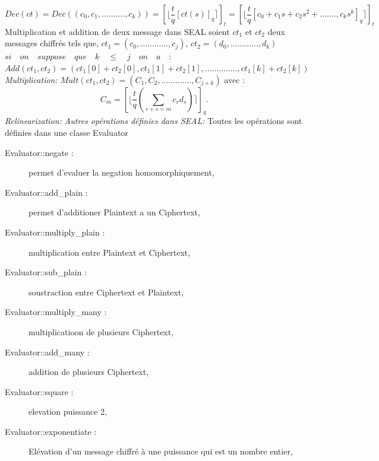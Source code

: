 \documentclass[a4paper,12pt]{article}
\begin{document}
$Dec(ct) = Dec((c_0, c_1, .........., c_k)) = [\lfloor\dfrac{t}{q}[ct(s)]_q\rceil]_t = [\lfloor\dfrac{t}{q}[c_0 + c_1s+c_2s^2+.......,c_ks^k]_q\rceil]_t$\newline
Multiplication et addition de deux message dans SEAL\newline
{}
\hspace{2cm}soient $ct_1$ et $ct_2$ deux messages chiffrés tels que,\newline
\hspace{2cm}$ct_1 = (c_0,............,c_j)$, $ct_2 = (d_0,............,d_k)$
\newline
\newline
\hspace{2cm}$si\quad on\quad suppose\quad que\quad k\quad \leq \quad j\quad on\quad a \quad:$\newline
\newline
\hspace{2cm}$Add(ct_1, ct_2) = (ct_1[0]+ct_2[0],ct_1[1]+ct_2[1],..............,ct_1[k]+ct_2[k])$\newline
\newline
\hspace{2cm}\textit{Multiplication:}\newline
\newline
\hspace{2cm}$Mult(ct_1, ct_2) = (C_1,C_2,............., C_{j+k})$ avec :\newline
\hspace{2cm}$$C_m = [\lfloor\dfrac{t}{q}(\sum_{r+s=m}^{}c_rd_s)\rceil]_q.$$
\hspace{2cm}\textit{Relinearization:}\newline
\newline
\textit{Autres opérations définies dans SEAL:}\newline
Toutes les opérations sont définies dans une classe Evaluator\newline
\begin{description}
 \item[Evaluator::negate :] permet d'evaluer la negation homomorphiquement,
 \item[Evaluator::add\_plain :] permet d'additioner Plaintext a un Ciphertext,
 \item[Evaluator::multiply\_plain :] multiplication entre Plaintext et Ciphertext,
 \item[Evaluator::sub\_plain :] soustraction entre Ciphertext et Plaintext,
 \item[Evaluator::multiply\_many :] multiplicatioon de plusieurs Ciphertext,
 \item[Evaluator::add\_many :] addition de plusieurs Ciphertext,
 \item[Evaluator::square :] elevation puissance 2,
 \item[Evaluator::exponentiate :] Elévation d'un message chiffré à une puissance qui est un nombre entier,
  \end{description}
\end{document}
